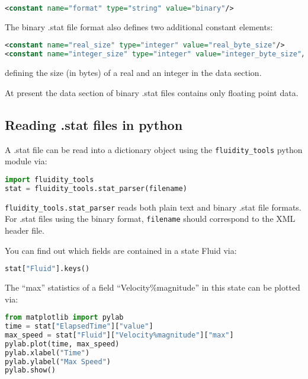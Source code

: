 \begin{lstlisting}[language = XML]
<constant name="format" type="string" value="binary"/>
\end{lstlisting}

The binary .stat file format also defines two additional constant elements:

\begin{lstlisting}[language = XML]
<constant name="real_size" type="integer" value="real_byte_size"/>
<constant name="integer_size" type="integer" value="integer_byte_size"/>
\end{lstlisting}

defining the size (in bytes) of a real and an integer in the data section.

At present the data section of binary .stat files contains only floating point
data.

\subsection{Reading .stat files in python}
\label{sec:diagnostics_stat_parser}

A .stat file can be read into a dictionary object using the
\lstinline[language = Python]*fluidity_tools* python module via:

\begin{lstlisting}[language = Python]
import fluidity_tools
stat = fluidity_tools.stat_parser(filename)
\end{lstlisting}

\lstinline[language = Python]*fluidity_tools.stat_parser* reads both
plain text and binary .stat file formats. For .stat files using the binary
format, \lstinline[language = Python]*filename* should correspond to the XML
header file.

You can find out which fields are contained in a state Fluid via:

\begin{lstlisting}[language=Python]
stat["Fluid"].keys()
\end{lstlisting}

The ``max'' statistics of a field ``Velocity\%magnitude'' in this state can be
plotted via:

\begin{lstlisting}[language=Python]
from matplotlib import pylab
time = stat["ElapsedTime"]["value"]
max_speed = stat["Fluid"]["Velocity%magnitude"]["max"]
pylab.plot(time, max_speed)
pylab.xlabel("Time")
pylab.ylabel("Max Speed")
pylab.show()
\end{lstlisting}


